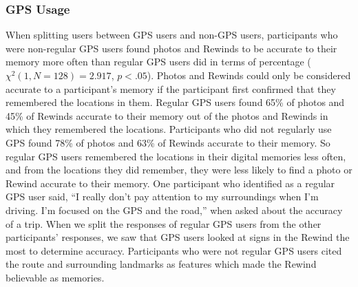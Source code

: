 \documentclass{sigchi}
\begin{document}
\subsubsection{GPS Usage}
When splitting users between GPS users and non-GPS users, participants who were non-regular GPS users found photos and Rewinds to be accurate to their memory more often than regular GPS users did in terms of percentage ($\chi^2(1, N=128) = 2.917$, $p <.05$). Photos and Rewinds could only be considered accurate to a participant's memory if the participant first confirmed that they remembered the locations in them.
Regular GPS users found 65\% of photos and 45\% of Rewinds accurate to their memory out of the photos and Rewinds in which they remembered the locations. Participants who did not regularly use GPS found 78\% of photos and 63\% of Rewinds accurate to their memory.
So regular GPS users remembered the locations in their digital memories less often, and from the locations they did remember, they were less likely to find a photo or Rewind accurate to their memory. One participant who identified as a regular GPS user said, ``I really don't pay attention to my surroundings when I'm driving. I'm focused on the GPS and the road,'' when asked about the accuracy of a trip.
When we split the responses of regular GPS users from the other participants' responses, we saw that GPS users looked at signs in the Rewind the most to determine accuracy. Participants who were not regular GPS users cited the route and surrounding landmarks as features which made the Rewind believable as memories.

\end{document}
